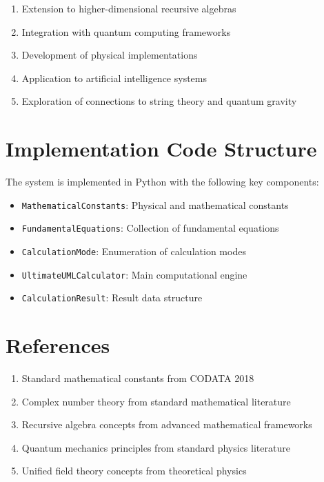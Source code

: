 \documentclass[12pt,a4paper]{article}
\begin{document}
\begin{enumerate}
\item Extension to higher-dimensional recursive algebras
\item Integration with quantum computing frameworks
\item Development of physical implementations
\item Application to artificial intelligence systems
\item Exploration of connections to string theory and quantum gravity
\end{enumerate}

\appendix

\section{Implementation Code Structure}

The system is implemented in Python with the following key components:

\begin{itemize}
\item \texttt{MathematicalConstants}: Physical and mathematical constants
\item \texttt{FundamentalEquations}: Collection of fundamental equations
\item \texttt{CalculationMode}: Enumeration of calculation modes
\item \texttt{UltimateUMLCalculator}: Main computational engine
\item \texttt{CalculationResult}: Result data structure
\end{itemize}

\section{References}

\begin{enumerate}
\item Standard mathematical constants from CODATA 2018
\item Complex number theory from standard mathematical literature
\item Recursive algebra concepts from advanced mathematical frameworks
\item Quantum mechanics principles from standard physics literature
\item Unified field theory concepts from theoretical physics
\end{enumerate}
\end{document}
